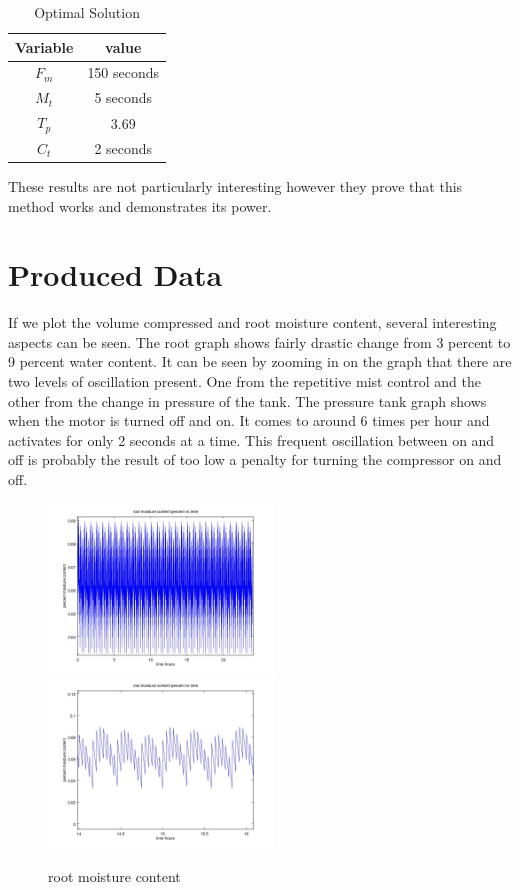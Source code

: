 \documentclass[a4paper,12pt]{article}
\begin{document}
\begin{table}[ht]
\caption{Optimal Solution}
\centering
\begin{tabular} {c c}
\hline\hline
 Variable & value \\ [0.5ex]
\hline
$F_m$ & 150 seconds \\
$M_t$ & 5 seconds \\
$T_p$ & 3.69 \\ 
$C_t$ & 2 seconds \\ 
\hline
\end{tabular}
\end{table}

These results are not particularly interesting however they prove that this method works and demonstrates its power.


\section{Produced Data}

If we plot the volume compressed and root moisture content, several interesting aspects can be seen. The root graph shows fairly drastic change from 3 percent to 9 percent water content. It can be seen by zooming in on the graph that there are two levels of oscillation present. One from the repetitive mist control and the other from the change in pressure of the tank. The pressure tank graph shows when the motor is turned off and on. It comes to around 6 times per hour and activates for only 2 seconds at a time. This frequent oscillation between on and off is probably the result of too low a penalty for turning the compressor on and off.

\begin{figure}[ht!]
	\centering
	\includegraphics[width=60mm]{root_moisture_content_1.jpg}
	\includegraphics[width=60mm]{root_moisture_content_2.jpg}
	\caption{root moisture content}
\end{figure}
\end{document}
